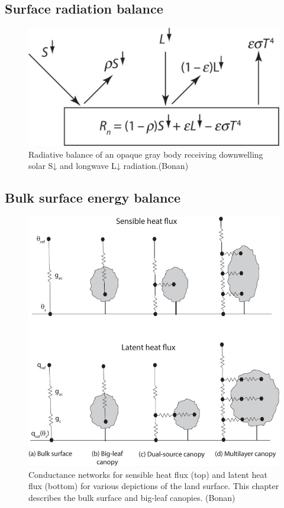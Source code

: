 \documentclass[12pt,oneside]{book}
\begin{document}
\subsection{Surface radiation balance}\label{surface-radiation-balance}

\begin{figure}

{\centering \includegraphics[width=0.8\linewidth]{figures/chap3/f329_rad_balance} 

}

\caption{Radiative balance of an opaque gray body receiving downwelling solar S↓ and longwave L↓ radiation.(Bonan)}\label{fig:f329}
\end{figure}

\subsection{Bulk surface energy
balance}\label{bulk-surface-energy-balance}

\begin{figure}

{\centering \includegraphics[width=0.8\linewidth]{figures/chap3/f330_E_balance} 

}

\caption{Conductance networks for sensible heat flux (top) and latent heat flux (bottom) for various depictions of the land surface. This chapter describes the bulk surface and big-leaf canopies. (Bonan)}\label{fig:f330}
\end{figure}
\end{document}
